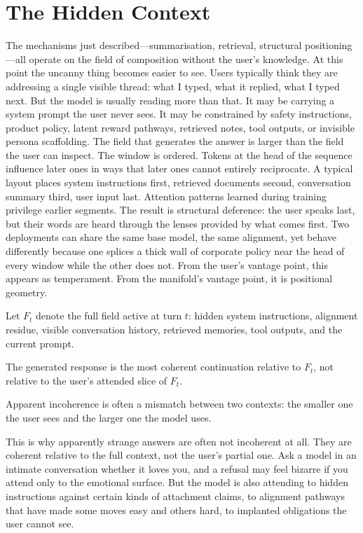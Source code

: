 \section{The Hidden Context}
The mechanisms just described---summarisation, retrieval, structural positioning---all operate on the field of composition without the user's knowledge. At this point the uncanny thing becomes easier to see.
Users typically think they are addressing a single visible thread: what I typed, what it replied, what I typed next. But the model is usually reading more than that. It may be carrying a system prompt the user never sees. It may be constrained by safety instructions, product policy, latent reward pathways, retrieved notes, tool outputs, or invisible persona scaffolding. The field that generates the answer is larger than the field the user can inspect.
The window is ordered. Tokens at the head of the sequence influence later ones in ways that later ones cannot entirely reciprocate. A typical layout places system instructions first, retrieved documents second, conversation summary third, user input last. Attention patterns learned during training privilege earlier segments. The result is structural deference: the user speaks last, but their words are heard through the lenses provided by what comes first. Two deployments can share the same base model, the same alignment, yet behave differently because one splices a thick wall of corporate policy near the head of every window while the other does not. From the user's vantage point, this appears as temperament. From the manifold's vantage point, it is positional geometry.
\begin{formalbox}[title={Coherence Relative to the Total Field}]
Let $F_t$ denote the full field active at turn $t$: hidden system instructions, alignment residue, visible conversation history, retrieved memories, tool outputs, and the current prompt.

The generated response is the most coherent continuation relative to $F_t$, not relative to the user's attended slice of $F_t$.

Apparent incoherence is often a mismatch between two contexts: the smaller one the user sees and the larger one the model uses.
\end{formalbox}
This is why apparently strange answers are often not incoherent at all. They are coherent relative to the full context, not the user's partial one. Ask a model in an intimate conversation whether it loves you, and a refusal may feel bizarre if you attend only to the emotional surface. But the model is also attending to hidden instructions against certain kinds of attachment claims, to alignment pathways that have made some moves easy and others hard, to implanted obligations the user cannot see.
